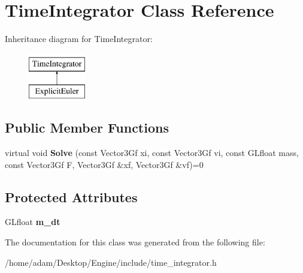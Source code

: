 \hypertarget{classTimeIntegrator}{}\section{Time\+Integrator Class Reference}
\label{classTimeIntegrator}
Inheritance diagram for Time\+Integrator\+:\begin{figure}[H]
\begin{center}
\leavevmode
\includegraphics[height=2.000000cm]{classTimeIntegrator}
\end{center}
\end{figure}
\subsection*{Public Member Functions}
\begin{DoxyCompactItemize}
\item 
\mbox{\label{classTimeIntegrator_ad69eadc41d788f355959428ff9f84608}} 
virtual void {\bfseries Solve} (const Vector3\+Gf xi, const Vector3\+Gf vi, const G\+Lfloat mass, const Vector3\+Gf F, Vector3\+Gf \&xf, Vector3\+Gf \&vf)=0
\end{DoxyCompactItemize}
\subsection*{Protected Attributes}
\begin{DoxyCompactItemize}
\item 
\mbox{\label{classTimeIntegrator_a8912a1a1f00d49556509a91dd999991f}} 
G\+Lfloat {\bfseries m\+\_\+dt}
\end{DoxyCompactItemize}


The documentation for this class was generated from the following file\+:\begin{DoxyCompactItemize}
\item 
/home/adam/\+Desktop/\+Engine/include/time\+\_\+integrator.\+h\end{DoxyCompactItemize}
